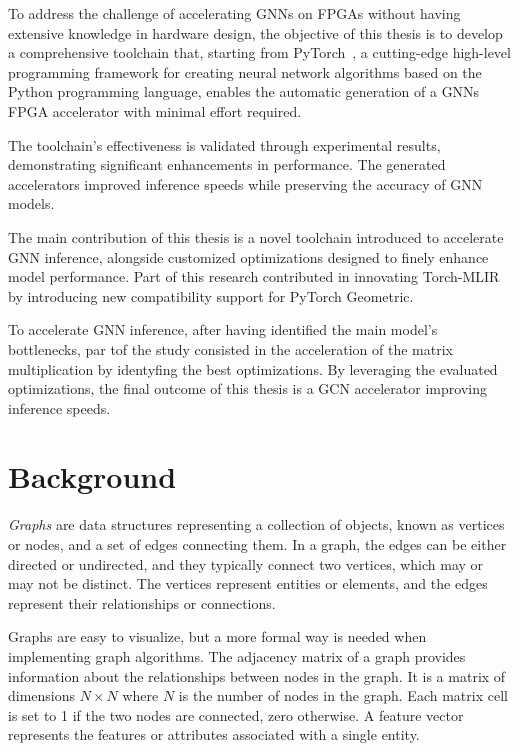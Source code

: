 \documentclass[11pt,a4paper,twocolumn]{article}
\begin{document}
To address the challenge of accelerating GNNs on FPGAs without having extensive knowledge in hardware design, the objective of this thesis is to develop a comprehensive toolchain that, starting from PyTorch~\cite{DBLP:journals/corr/abs-1912-01703},
a cutting-edge high-level programming framework for creating neural network algorithms based on the Python programming language, enables the
automatic generation of a GNNs FPGA accelerator with minimal effort required.

The toolchain's effectiveness is validated through experimental results, demonstrating significant enhancements in performance.
The generated accelerators improved inference speeds while preserving the accuracy of GNN models.

The main contribution of this thesis is a novel toolchain introduced to accelerate GNN inference, alongside customized optimizations designed to finely enhance model performance.
Part of this research contributed in innovating Torch-MLIR by introducing new compatibility support for PyTorch Geometric.

To accelerate GNN inference, after having identified the main model's bottlenecks, par tof the study consisted in the acceleration of the matrix multiplication by identyfing the best optimizations.
By leveraging the evaluated optimizations, the final outcome of this thesis is a GCN accelerator improving inference speeds.


\section{Background}
\label{sec:background}%

\textit{Graphs} are data structures representing a collection of objects, known as vertices or nodes, and a set of edges connecting them.
In a graph, the edges can be either directed or undirected, and they typically connect two vertices, which may or may not be distinct.
The vertices represent entities or elements, and the edges represent their relationships or connections.

Graphs are easy to visualize, but a more formal way is needed when implementing graph algorithms.
The adjacency matrix of a graph provides information about the relationships between nodes in the graph.
It is a matrix of dimensions $N \times N$ where $N$ is the number of nodes in the graph. Each matrix cell is set to 1 if the two nodes are connected, zero otherwise.
A feature vector represents the features or attributes associated with a single entity.
\end{document}
